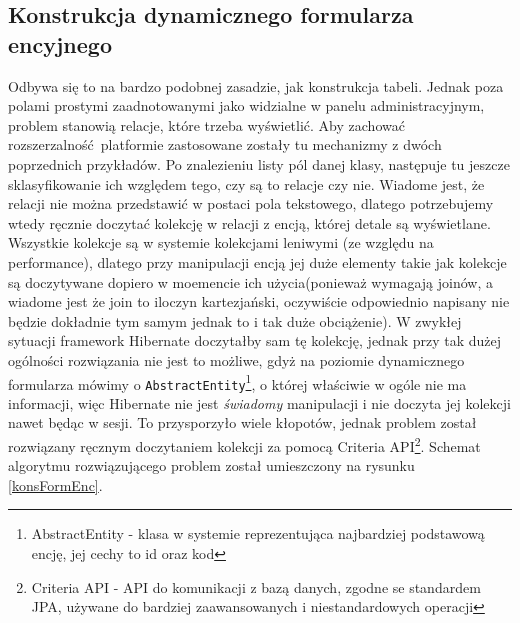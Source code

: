 \newpage
\subsection{Konstrukcja dynamicznego formularza encyjnego} \label{s_konDynForm}
Odbywa się to na bardzo podobnej zasadzie, jak konstrukcja tabeli. Jednak poza polami prostymi zaadnotowanymi jako widzialne w panelu administracyjnym, problem stanowią relacje, które trzeba wyświetlić. Aby zachować rozszerzalność platformie zastosowane zostały tu mechanizmy z dwóch poprzednich przykładów. Po znalezieniu listy pól danej klasy, następuje tu jeszcze sklasyfikowanie ich względem tego, czy są to relacje czy nie. Wiadome jest, że relacji nie można przedstawić w postaci pola tekstowego, dlatego potrzebujemy wtedy ręcznie doczytać kolekcję w relacji z encją, której detale są wyświetlane. Wszystkie kolekcje są w systemie kolekcjami leniwymi (ze względu na performance), dlatego przy manipulacji encją jej duże elementy takie jak kolekcje są doczytywane dopiero w moemencie ich użycia(ponieważ wymagają joinów, a wiadome jest że join to iloczyn kartezjański, oczywiście odpowiednio napisany nie będzie dokładnie tym samym jednak to i tak duże obciążenie). W zwykłej sytuacji framework Hibernate doczytałby sam tę kolekcję, jednak przy tak dużej ogólności rozwiązania nie jest to możliwe, gdyż na poziomie dynamicznego formularza mówimy o \texttt{AbstractEntity}\footnote{AbstractEntity - klasa w systemie reprezentująca najbardziej podstawową encję, jej cechy to id oraz kod}, o której właściwie w ogóle nie ma informacji, więc Hibernate nie jest \textit{świadomy} manipulacji i nie doczyta jej kolekcji nawet będąc w sesji. To przysporzyło wiele kłopotów, jednak problem został rozwiązany ręcznym doczytaniem kolekcji za pomocą Criteria API\footnote{Criteria API - API do komunikacji z bazą danych, zgodne se standardem JPA, używane do bardziej zaawansowanych i niestandardowych operacji}. Schemat algorytmu rozwiązującego problem został umieszczony na rysunku \ref{konsFormEnc}.

